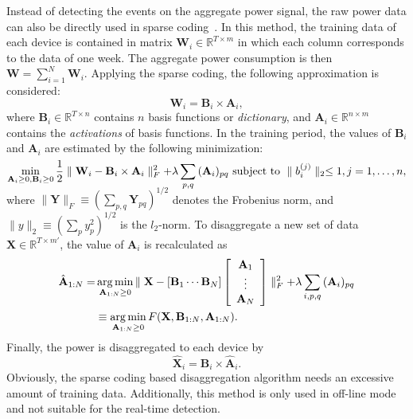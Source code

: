 Instead of detecting the events on the aggregate power signal, the raw power data can also be directly used in sparse coding~\cite{Kolter10,Pathak15}. In this method, the training data of each device is contained in matrix $\mathbf{W}_i\in \mathbb{R}^{T\times m}$ in which each column corresponds to the data of one week. The aggregate power consumption is then $\mathbf{W}=\sum_{i=1}^N{\mathbf{W}_i}$. Applying the sparse coding, the following approximation is considered: 
\begin{equation}
\mathbf{W}_i=\mathbf{B}_i\times \mathbf{A}_i, 
\end{equation}
where $\mathbf{B}_i\in \mathbb{R}^{T\times n}$ contains $n$ basis functions or \textit{dictionary}, and $\mathbf{A}_i\in \mathbb{R}^{n\times m}$ contains the \textit{activations} of basis functions. In the training period, the values of $\mathbf{B}_i$ and $\mathbf{A}_i$ are estimated by the following minimization:
\begin{equation}
\smash{\displaystyle\min_{\mathbf{A}_i\geq 0,\mathbf{B}_i\geq 0}{\frac{1}{2}\parallel \mathbf{W}_i-\mathbf{B}_i\times \mathbf{A}_i\parallel_F^2 + \lambda\sum_{p,q}{(\mathbf{A}_i)_{pq}}}} \mbox{ subject to } \parallel b_i^{(j)} \parallel_2 \leq 1, j=1,\ldots,n,
\end{equation}
where $\parallel \mathbf{Y}\parallel_F \equiv (\sum_{p,q}{\mathbf{Y}_{pq}})^{1/2}$ denotes the Frobenius norm, and $\parallel y \parallel_2 \equiv (\sum_{p}{y_p^2})^{1/2}$ is the $l_2$-norm.
To disaggregate a new set of data $\mathbf{X}\in \mathbb{R}^{T\times m'}$, the value of $\mathbf{A}_i$ is recalculated as
\begin{equation}
\begin{split}
\hat{\mathbf{A}}_{1:N}=&\operatorname*{arg\,min}_{\mathbf{A}_{1:N}\geq 0}{\parallel \mathbf{X}-\left[ \mathbf{B}_1\cdots \mathbf{B}_N\right] \left[\begin{array}{c}\mathbf{A}_1\\ \vdots \\ \mathbf{A}_N \end{array}\right]  \parallel_F^2 + \lambda \sum_{i,p,q}{(\mathbf{A}_i)_{pq}}}\\
&\equiv \operatorname*{arg\,min}_{\mathbf{A}_{1:N}\geq 0}{F(\mathbf{X},\mathbf{B}_{1:N},\mathbf{A}_{1:N})}.
\end{split}
\end{equation}
Finally, the power is disaggregated to each device by
\begin{equation}
\hat{\mathbf{X}}_i=\mathbf{B}_i\times \hat{\mathbf{A}}_i.
\end{equation}
Obviously, the sparse coding based disaggregation algorithm needs an excessive amount of training data. Additionally, this method is only used in off-line mode and not suitable for the real-time detection.



